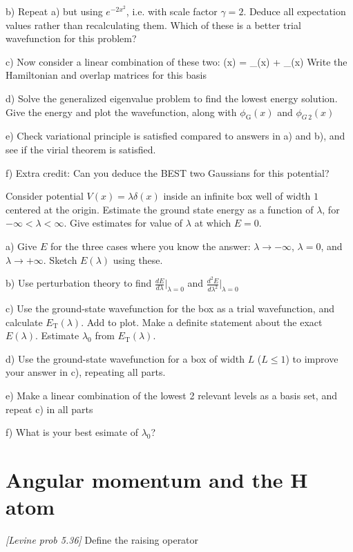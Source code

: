 b) Repeat a) but using $e^{-2x^2}$, i.e. with scale factor $\gamma = 2$. Deduce
all expectation values rather than recalculating them. Which of these is a better
trial wavefunction for this problem?

c) Now consider a linear combination of these two:
\be
   \phi(x) = \alpha\phi_{}(x) + \beta\phi_{}(x)
\ee
Write the Hamiltonian and overlap matrices for this basis

d) Solve the generalized eigenvalue problem to find the lowest energy solution. Give
the energy and plot the wavefunction, along with $\phi_{\text{G}}(x)$ and $\phi_{G\,2}(x)$

e) Check variational principle is satisfied compared to answers in a) and b), and see
if the virial theorem is satisfied.

f) Extra credit: Can you deduce the BEST two Gaussians for this potential?

\newpage
{}
Consider potential $V(x) = \lambda\delta(x)$ inside an infinite box well of width $1$ centered
at the origin. Estimate the ground state energy as a function of $\lambda$, for $-\infty < \lambda < \infty$.
Give estimates for value of $\lambda$ at which $E=0$.

a) Give $E$ for the three cases where you know the answer: $\lambda \rightarrow -\infty$,
$\lambda=0$, and $\lambda \rightarrow +\infty$. Sketch $E(\lambda)$ using these.

b) Use perturbation theory to find $\frac{dE}{d\lambda}\Bigg|_{\lambda=0}$ and $\frac{d^2E}{d\lambda^2}\Bigg|_{\lambda=0}$

c) Use the ground-state wavefunction for the box as a trial wavefunction, and calculate
$E_{\text{T}}(\lambda)$. Add to plot. Make a definite statement about the exact $E(\lambda)$.
Estimate $\lambda_0$ from $E_{\text{T}}(\lambda)$.

d) Use the ground-state wavefunction for a box of width $L$ ($L \leq 1$) to improve
your answer in c), repeating all parts.

e) Make a linear combination of the lowest 2 relevant levels as a basis set, and repeat
c) in all parts

f) What is your best esimate of $\lambda_0$?

\newpage
\part{Angular momentum and the H atom}
\newpage
{}
{\em [Levine prob 5.36]}
Define the raising operator

